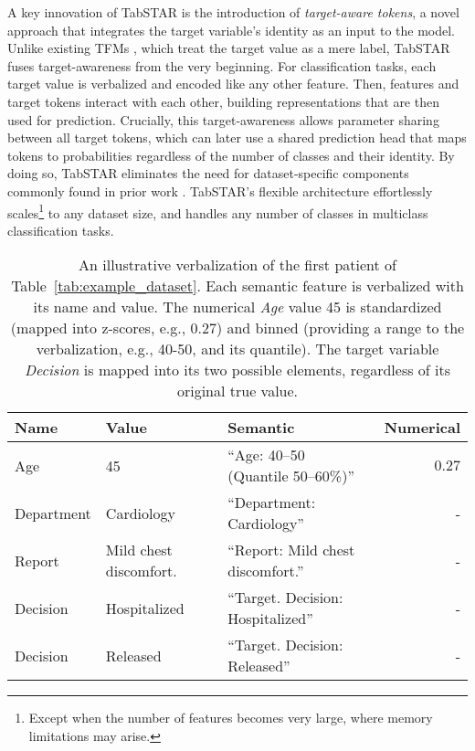 \documentclass{article}
\begin{document}
A key innovation of TabSTAR is the introduction of \textit{target-aware tokens}, a novel approach that integrates the target variable's identity as an input to the model. Unlike existing TFMs \cite{hollmann_accurate_2025, kim_carte_2024, yan_making_2023, ye_towards_2024, zhu_xtab_2023, wang_transtab_2022}, which treat the target value as a mere label, TabSTAR fuses target-awareness from the very beginning. For classification tasks, each target value is verbalized and encoded like any other feature. Then, features and target tokens interact with each other, building representations that are then used for prediction. Crucially, this target-awareness allows parameter sharing between all target tokens, which can later use a shared prediction head that maps tokens to probabilities regardless of the number of classes and their identity. By doing so, TabSTAR eliminates the need for dataset-specific components commonly found in prior work \cite{gorishniy_revisiting_2021, zhu_xtab_2023, yan_making_2023}. TabSTAR's flexible architecture effortlessly scales\footnote{Except when the number of features becomes very large, where memory limitations may arise.} to any dataset size, and handles any number of classes in multiclass classification tasks.

\begin{table}[h]
\centering
\caption{An illustrative verbalization of the first patient of Table~\ref{tab:example_dataset}. Each semantic feature is verbalized with its name and value. The numerical \textit{Age} value 45 is standardized (mapped into z-scores, e.g., 0.27) and binned (providing a range to the verbalization, e.g., 40-50, and its quantile). The target variable  \textit{Decision} is mapped into its two possible elements, regardless of its original true value.}
\begin{tabular}{lllr}
\toprule
\textbf{Name} & \textbf{Value} & \textbf{Semantic} & \textbf{Numerical} \\
\midrule
Age             & 45                            & ``Age: 40–50 (Quantile 50–60\%)''               & $0.27$      \\
Department      & Cardiology                    & ``Department: Cardiology''                     & \phantom{0}-  \\
Report          & Mild chest discomfort.        & ``Report: Mild chest discomfort.''             & \phantom{0}-  \\
Decision        & Hospitalized                  & ``Target. Decision: Hospitalized''             & \phantom{0}-  \\
Decision & Released          & ``Target. Decision: Released''       & \phantom{0}-  \\
\bottomrule
\end{tabular}
\label{tab:patient_verbalization}
\end{table}
\end{document}
